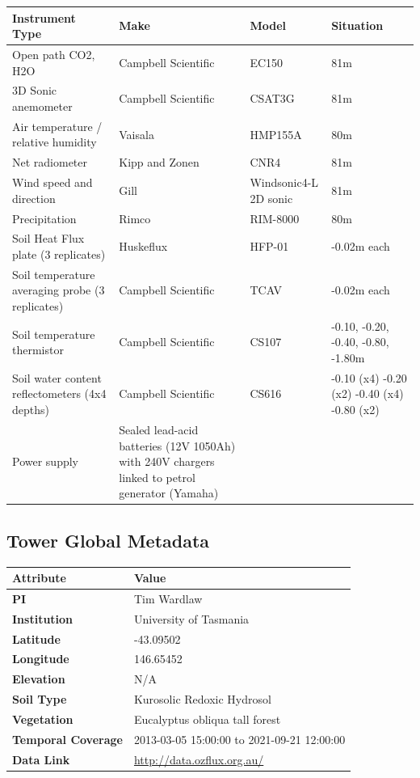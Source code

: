 \documentclass[11pt,a4paper]{article}
\begin{document}
\begin{longtable}{p{4.5cm}p{3.5cm}p{3.5cm}p{3.5cm}}
\toprule
\textbf{Instrument Type} & \textbf{Make} & \textbf{Model} & \textbf{Situation} \\
\midrule
\endhead
\bottomrule
\endfoot
Open path  CO2, H2O & Campbell Scientific & EC150 & 81m \\
3D Sonic anemometer & Campbell Scientific & CSAT3G & 81m \\
Air temperature / relative humidity & Vaisala & HMP155A & 80m \\
Net radiometer & Kipp  and Zonen & CNR4 & 81m \\
Wind speed and direction & Gill & Windsonic4-L 2D sonic & 81m \\
Precipitation & Rimco & RIM-8000 & 80m \\
Soil Heat Flux plate (3 replicates) & Huskeflux & HFP-01 & -0.02m  each \\
Soil  temperature averaging probe                 (3 replicates) & Campbell Scientific & TCAV & -0.02m each \\
Soil temperature thermistor & Campbell Scientific & CS107 & -0.10, -0.20, -0.40, -0.80,  -1.80m \\
Soil  water content reflectometers                 (4x4 depths) & Campbell Scientific & CS616 & -0.10 (x4)                 -0.20 (x2)                  -0.40 (x4)                -0.80 (x2) \\
Power supply & Sealed lead-acid batteries (12V  1050Ah) with 240V chargers linked to petrol generator (Yamaha) &  &  \\
\end{longtable}


\subsection*{Tower Global Metadata}

\begin{longtable}{p{4.5cm}p{10.5cm}}
\toprule
\textbf{Attribute} & \textbf{Value} \\
\midrule
\endhead
\bottomrule
\endfoot
\textbf{PI} & Tim Wardlaw \\
\textbf{Institution} & University of Tasmania \\
\textbf{Latitude} & -43.09502 \\
\textbf{Longitude} & 146.65452 \\
\textbf{Elevation} & N/A \\
\textbf{Soil Type} & Kurosolic Redoxic Hydrosol \\
\textbf{Vegetation} & Eucalyptus obliqua tall forest \\
\textbf{Temporal Coverage} & 2013-03-05 15:00:00 to 2021-09-21 12:00:00 \\
\textbf{Data Link} & \url{http://data.ozflux.org.au/} \\
\end{longtable}
\end{document}
